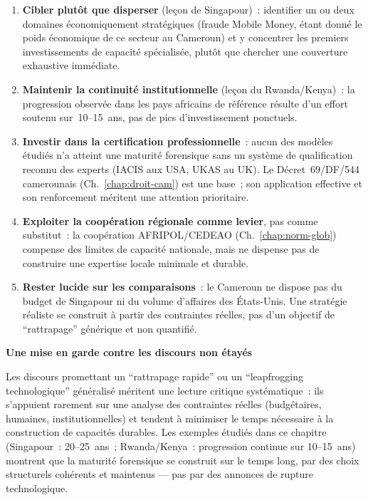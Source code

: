 \begin{enumerate}
    \item \textbf{Cibler plutôt que disperser} (leçon de Singapour)~:
          identifier un ou deux domaines économiquement stratégiques
          (fraude Mobile Money, étant donné le poids économique de
          ce secteur au Cameroun) et y concentrer les premiers
          investissements de capacité spécialisée, plutôt que
          chercher une couverture exhaustive immédiate.
    \item \textbf{Maintenir la continuité institutionnelle}
          (leçon du Rwanda/Kenya)~: la progression observée dans
          les pays africains de référence résulte d'un effort
          soutenu sur~10--15~ans, pas de pics d'investissement
          ponctuels.
    \item \textbf{Investir dans la certification professionnelle}~:
          aucun des modèles étudiés n'a atteint une maturité
          forensique sans un système de qualification reconnu
          des experts (IACIS aux USA, UKAS au UK). Le
          Décret~69/DF/544 camerounais (Ch.~\ref{chap:droit-cam})
          est une base~; son application effective et son
          renforcement méritent une attention prioritaire.
    \item \textbf{Exploiter la coopération régionale comme levier},
          pas comme substitut~: la coopération AFRIPOL/CEDEAO
          (Ch.~\ref{chap:norm-glob}) compense des limites de
          capacité nationale, mais ne dispense pas de construire
          une expertise locale minimale et durable.
    \item \textbf{Rester lucide sur les comparaisons}~: le Cameroun
          ne dispose pas du budget de Singapour ni du volume
          d'affaires des États-Unis. Une stratégie réaliste se
          construit à partir des contraintes réelles, pas d'un
          objectif de ``rattrapage'' générique et non quantifié.
\end{enumerate}

\begin{boxalert}
\textbf{Une mise en garde contre les discours non étayés}

Les discours promettant un ``rattrapage rapide'' ou un
``leapfrogging technologique'' généralisé méritent une lecture
critique systématique~: ils s'appuient rarement sur une analyse
des contraintes réelles (budgétaires, humaines, institutionnelles)
et tendent à minimiser le temps nécessaire à la construction de
capacités durables. Les exemples étudiés dans ce chapitre
(Singapour~: 20--25~ans~; Rwanda/Kenya~: progression continue sur
10--15~ans) montrent que la maturité forensique se construit sur
le temps long, par des choix structurels cohérents et maintenus
--- pas par des annonces de rupture technologique.
\end{boxalert}

